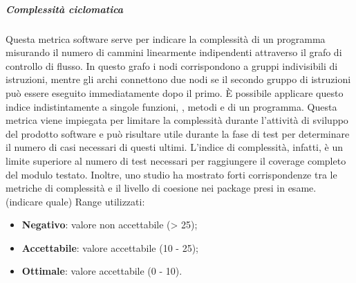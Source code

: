 \documentclass[../PianoDiQualifica.tex]{subfiles}
\begin{document}
			\subparagraph{Complessità ciclomatica}
			Questa metrica software serve per indicare la complessità di un programma misurando il numero di cammini linearmente indipendenti attraverso il grafo di controllo di flusso. In questo grafo i nodi corrispondono a gruppi indivisibili di istruzioni, mentre gli archi connettono due nodi se il secondo gruppo di istruzioni può essere eseguito immediatamente dopo il primo. È possibile applicare questo indice indistintamente a singole funzioni, , metodi e  di un programma. Questa metrica viene impiegata per limitare la complessità durante l'attività di sviluppo del prodotto software e può risultare utile durante la fase di test per determinare il numero di casi necessari di questi ultimi. L'indice di complessità, infatti, è un limite superiore al numero di test necessari per raggiungere il coverage completo del modulo testato. Inoltre, uno studio ha mostrato forti corrispondenze tra le metriche di complessità e il livello di coesione nei package presi in esame. (indicare quale)
				Range utilizzati:
				\begin{itemize}
					\item \textbf{Negativo}: valore non accettabile (> 25);
					\item \textbf{Accettabile}: valore accettabile (10 - 25);
					\item \textbf{Ottimale}: valore accettabile (0 - 10).
				\end{itemize}
\end{document}
